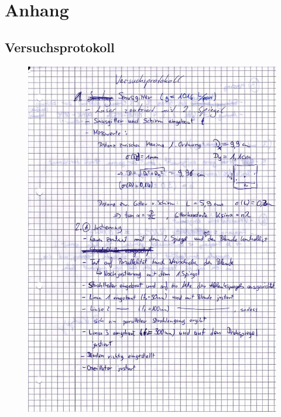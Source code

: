 \section{Anhang}
\begin{appendix}

\section{Versuchsprotokoll}

\begin{figure}[H]
\centering \includegraphics[width=\textwidth]{Bilder/Protokoll1.jpg}
\end{figure}

\clearpage



\end{appendix}
